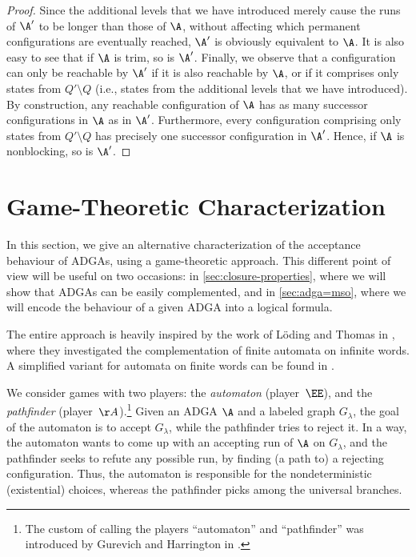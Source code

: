 \documentclass[a4paper,11pt,twoside]{report} \pdfoutput=1
\begin{document}
\begin{proof}
  Since the additional levels that we have introduced merely cause the
  runs of $\A'$ to be longer than those of $\A$, without affecting
  which permanent configurations are eventually reached, $\A'$ is
  obviously equivalent to $\A$. It is also easy to see that if $\A$ is
  trim, so is $\A'$. Finally, we observe that a configuration can only
  be reachable by $\A'$ if it is also reachable by $\A$, or if it
  comprises only states from $Q'\setminus Q$ (i.e., states from the
  additional levels that we have introduced). By construction, any
  reachable configuration of $\A$ has as many successor configurations
  in $\A$ as in $\A'$. Furthermore, every configuration comprising
  only states from $Q'\setminus Q$ has precisely one successor
  configuration in $\A'$. Hence, if $\A$ is nonblocking, so is $\A'$.
\end{proof}

\section{Game-Theoretic Characterization} \label{sec:game-theo}
In this section, we give an alternative characterization of the
acceptance behaviour of ADGAs, using a game-theoretic approach. This
different point of view will be useful on two occasions: in
\cref{sec:closure-properties}, where we will show that ADGAs can be
easily complemented, and in \cref{sec:adga=mso}, where we will encode
the behaviour of a given ADGA into a logical formula.

The entire approach is heavily inspired by the work of Löding and
Thomas in \cite{LT00}, where they investigated the complementation of
finite automata on infinite words. A simplified variant for automata
on finite words can be found in \cite{Kum06}.

We consider games with two players: the \emph{automaton}
(player~$\EE$), and the \emph{pathfinder} (player~$\AA$).\footnote{The
  custom of calling the players “automaton” and “pathfinder” was
  introduced by Gurevich and Harrington in \cite{GH82}.} Given an ADGA
$\A$ and a labeled graph $G_λ$, the goal of the automaton is to accept
$G_λ$, while the pathfinder tries to reject it. In a way, the
automaton wants to come up with an accepting run of $\A$ on $G_λ$, and
the pathfinder seeks to refute any possible run, by finding (a path
to) a rejecting configuration. Thus, the automaton is responsible for
the nondeterministic (existential) choices, whereas the pathfinder
picks among the universal branches.
\end{document}
